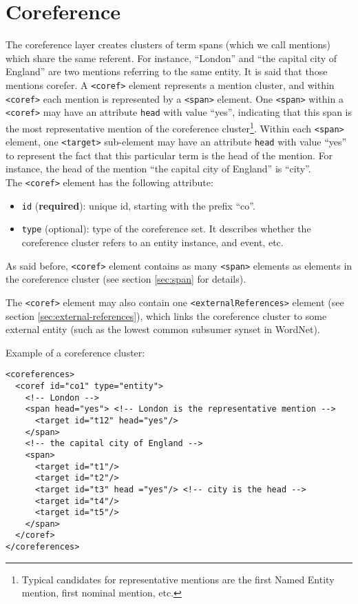 
\section{Coreference}
\label{sec:coreference}

The coreference layer creates clusters of term spans (which we call
mentions) which share the same referent. For instance, ``London'' and ``the
capital city of England'' are two mentions referring to the same entity. It
is said that those mentions corefer.  A \texttt{<coref>} element represents
a mention cluster, and within \texttt{<coref>} each mention is represented
by a \texttt{<span>} element. One
\texttt{<span>} within a \texttt{<coref>} may have an attribute
\texttt{head} with value ``yes'', indicating that this span is the most
representative mention of the coreference cluster\footnote{Typical
  candidates for representative mentions are the first Named Entity mention,
  first nominal mention, etc. }. Within each \texttt{<span>} element, one
\texttt{<target>} sub-element may have an attribute \texttt{head} with value
``yes'' to represent the fact that this particular term is the head of the
mention. For instance, the head of the mention ``the capital city of
England'' is ``city''.\\

The \texttt{<coref>} element has the following attribute:
\begin{itemize}
\item \texttt{id} (\textbf{required}): unique id, starting with the prefix ``co''.
\item \texttt{type} (optional): type of the coreference set. It describes
  whether the coreference cluster refers to an entity instance, and event,
  etc.
\end{itemize}

As said before, \texttt{<coref>} element contains as many \texttt{<span>}
elements as elements in the coreference cluster (see section
\ref{sec:span} for details).

The \texttt{<coref>} element may also contain one
\texttt{<externalReferences>} element (see section
\ref{sec:external-references}), which links the coreference cluster to some
external entity (such as the lowest common subsumer synset in WordNet).

Example of a coreference cluster:

\begin{Verbatim}[fontsize=\small]
<coreferences>
  <coref id="co1" type="entity">
    <!-- London -->
    <span head="yes"> <!-- London is the representative mention -->
      <target id="t12" head="yes"/>
    </span>
    <!-- the capital city of England -->
    <span>
      <target id="t1"/>
      <target id="t2"/>
      <target id="t3" head ="yes"/> <!-- city is the head -->
      <target id="t4"/>
      <target id="t5"/>
    </span>
  </coref>
</coreferences>
\end{Verbatim}


